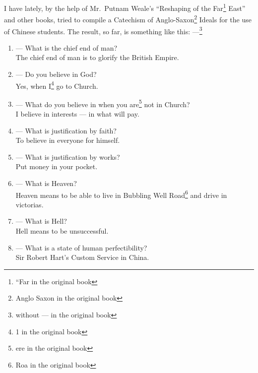 I have lately, by the help of Mr.~Putnam Weale's  ``Reshaping of the Far\footnote{``Far in the original book} East'' and other books, tried to compile a Catechism of Anglo-Saxon\footnote{Anglo Saxon in the original book} Ideals for the use of Chinese students.
The result, so far, is something like this: ---\footnote{without --- in the original book}
\begin{enumerate}
    \item --- What is the chief end of man? \\ The chief end of man is to glorify the British Empire. \vspace{-0.2cm}
    \item --- Do you believe in God? \\ Yes, when I\footnote{1 in the original book} go to Church.\vspace{-0.2cm}
    \item --- What do you believe in when you are\footnote{ere in the original book} not in Church? \\ I believe in interests --- in what will pay.\vspace{-0.2cm}
    \item --- What is justification by faith? \\ To believe in everyone for himself.\vspace{-0.2cm}
    \item --- What is justification by works? \\ Put money in your pocket.\vspace{-0.2cm}
    \item --- What is Heaven? \\ Heaven means to be able to live in Bubbling Well Road\footnote{Roa in the original book}  and drive in victorias.\vspace{-0.2cm}
    \item --- What is Hell? \\ Hell means to be unsuccessful.\vspace{-0.2cm}
    \item --- What is a state of human perfectibility? \\ Sir Robert Hart's  Custom  Service in China.\vspace{-0.2cm}

\end{enumerate}
